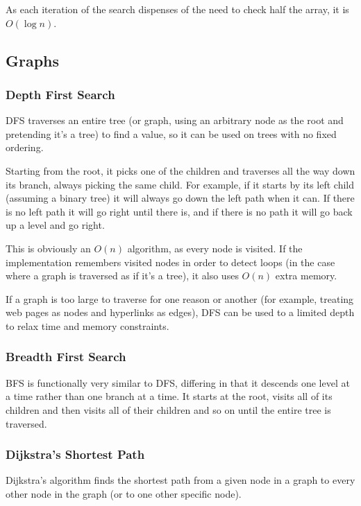 \documentclass[]{article}
\begin{document}
As each iteration of the search dispenses of the need to check half the array, it is $O(\log{n})$.

\pagebreak

\subsection{Graphs}

\subsubsection{Depth First Search}

DFS traverses an entire tree (or graph, using an arbitrary node as the root and pretending it's a tree) to find a value, so it can be used on trees with no fixed ordering.

Starting from the root, it picks one of the children and traverses all the way down its branch, always picking the same child. For example, if it starts by its left child (assuming a binary tree) it will always go down the left path when it can. If there is no left path it will go right until there is, and if there is no path it will go back up a level and go right.

This is obviously an $O(n)$ algorithm, as every node is visited. If the implementation remembers visited nodes in order to detect loops (in the case where a graph is traversed as if it's a tree), it also uses $O(n)$ extra memory.

If a graph is too large to traverse for one reason or another (for example, treating web pages as nodes and hyperlinks as edges), DFS can be used to a limited depth to relax time and memory constraints.

\subsubsection{Breadth First Search}

BFS is functionally very similar to DFS, differing in that it descends one level at a time rather than one branch at a time. It starts at the root, visits all of its children and then visits all of their children and so on until the entire tree is traversed.

\subsubsection{Dijkstra's Shortest Path}

Dijkstra's algorithm finds the shortest path from a given node in a graph to every other node in the graph (or to one other specific node).
\end{document}
